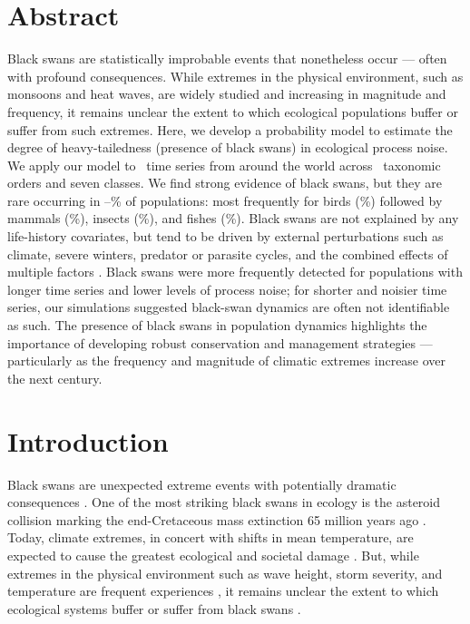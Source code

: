 


\section{Abstract}

Black swans are statistically improbable events that nonetheless occur --- often with profound consequences. While extremes in the physical environment, such as monsoons and heat waves, are widely studied and increasing in magnitude and frequency, it remains unclear the extent to which ecological populations buffer or suffer from such extremes. Here, we develop a probability model to estimate the degree of heavy-tailedness (presence of black swans) in ecological process noise. We apply our model to \NPops~time series from around the world across \NOrders~taxonomic orders and seven classes. We find strong evidence of black swans, but they are rare occurring in \overallMinPerc--\overallMaxPerc\% of populations: most frequently for birds (\AvesRangePerc\%) followed by mammals (\MammaliaRangePerc\%), insects (\InsectaRangePerc\%), and fishes (\OsteichthyesRangePerc\%). Black swans are not explained by any life-history covariates, but tend to be driven by external perturbations such as climate, severe winters, predator or parasite cycles, and the combined effects of multiple factors . Black swans were more frequently detected for populations with longer time series and lower levels of process noise; for shorter and noisier time series, our simulations suggested black-swan dynamics are often not identifiable as such. The presence of black swans in population dynamics highlights the importance of developing robust conservation and management strategies --- particularly as the frequency and magnitude of climatic extremes increase over the next century.

\section{Introduction}

Black swans are unexpected extreme events with potentially dramatic consequences \citep{taleb2007,sornette2009}. One of the most striking black swans in ecology is the asteroid collision marking the end-Cretaceous mass extinction 65 million years ago \citep{alvarez1980,harnik2012}. Today, climate extremes, in concert with shifts in mean temperature, are expected to cause the greatest ecological and societal damage \citep{ipcc2012}. But, while extremes in the physical environment such as wave height, storm severity, and temperature are frequent experiences \citep{gaines1993,katz2005}, it remains unclear the extent to which ecological systems buffer or suffer from black swans \citep{nunez2012}.

